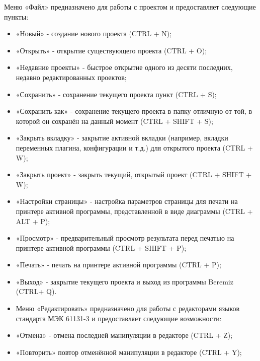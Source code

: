 \documentclass[letterpaper,10pt,russian]{sphinxmanual}
\begin{document}
Меню «Файл» предназначено для работы с проектом и предоставляет
следующие пункты:
\begin{itemize}
\item {} 
«Новый» - создание нового проекта (CTRL + N);

\item {} 
«Открыть» - открытие существующего проекта (CTRL + O);

\item {} 
«Недавние проекты» - быстрое открытие одного из десяти последних,
недавно редактированных проектов;

\item {} 
«Сохранить» - сохранение текущего проекта пункт (CTRL + S);

\item {} 
«Сохранить как» - сохранение текущего проекта в папку отличную от
той, в которой он сохранён на данный момент (CTRL + SHIFT + S);

\item {} 
«Закрыть вкладку» - закрытие активной вкладки (например, вкладки
переменных плагина, конфигурации и т.д.) для открытого проекта (CTRL
+ W);

\item {} 
«Закрыть проект» - закрыть текущий, открытый проект (CTRL + SHIFT +
W);

\item {} 
«Настройки страницы» - настройка параметров страницы для печати на
принтере активной программы, представленной в виде диаграммы (CTRL +
ALT + P);

\item {} 
«Просмотр» - предварительный просмотр результата перед печатью на
принтере активной программы (CTRL + SHIFT + P);

\item {} 
«Печать» - печать на принтере активной программы (CTRL + P);

\item {} 
«Выход» - закрытие текущего проекта и выход из программы Beremiz
(CTRL+ Q).

\item {} 
Меню «Редактировать» предназначено для работы с редакторами языков
стандарта МЭК 61131-3 и предоставляет следующие возможности:

\item {} 
«Отмена» - отмена последней манипуляции в редакторе (CTRL + Z);

\item {} 
«Повторить» повтор отменённой манипуляции в редакторе (CTRL + Y);


\end{itemize}
\end{document}
